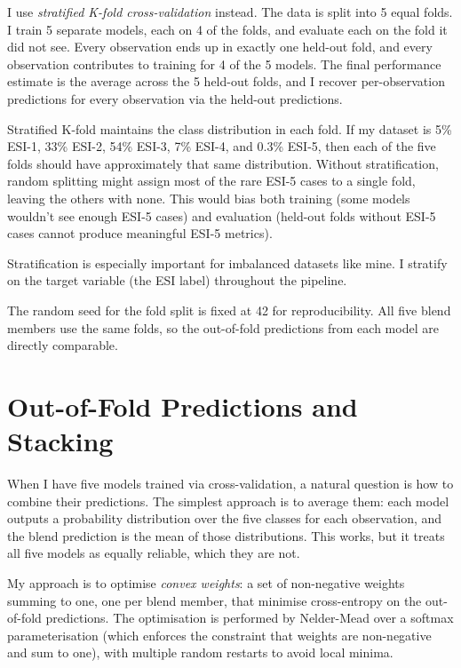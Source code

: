 I use \emph{stratified K-fold cross-validation} instead. The data is split into 5 equal folds. I train 5 separate models, each on 4 of the folds, and evaluate each on the fold it did not see. Every observation ends up in exactly one held-out fold, and every observation contributes to training for 4 of the 5 models. The final performance estimate is the average across the 5 held-out folds, and I recover per-observation predictions for every observation via the held-out predictions.

\begin{notebox}
Stratified K-fold maintains the class distribution in each fold. If my dataset is 5\% ESI-1, 33\% ESI-2, 54\% ESI-3, 7\% ESI-4, and 0.3\% ESI-5, then each of the five folds should have approximately that same distribution. Without stratification, random splitting might assign most of the rare ESI-5 cases to a single fold, leaving the others with none. This would bias both training (some models wouldn't see enough ESI-5 cases) and evaluation (held-out folds without ESI-5 cases cannot produce meaningful ESI-5 metrics).

Stratification is especially important for imbalanced datasets like mine. I stratify on the target variable (the ESI label) throughout the pipeline.
\end{notebox}

The random seed for the fold split is fixed at 42 for reproducibility. All five blend members use the same folds, so the out-of-fold predictions from each model are directly comparable.

\section{Out-of-Fold Predictions and Stacking}

When I have five models trained via cross-validation, a natural question is how to combine their predictions. The simplest approach is to average them: each model outputs a probability distribution over the five classes for each observation, and the blend prediction is the mean of those distributions. This works, but it treats all five models as equally reliable, which they are not.

My approach is to optimise \emph{convex weights}: a set of non-negative weights summing to one, one per blend member, that minimise cross-entropy on the out-of-fold predictions. The optimisation is performed by Nelder-Mead over a softmax parameterisation (which enforces the constraint that weights are non-negative and sum to one), with multiple random restarts to avoid local minima.

